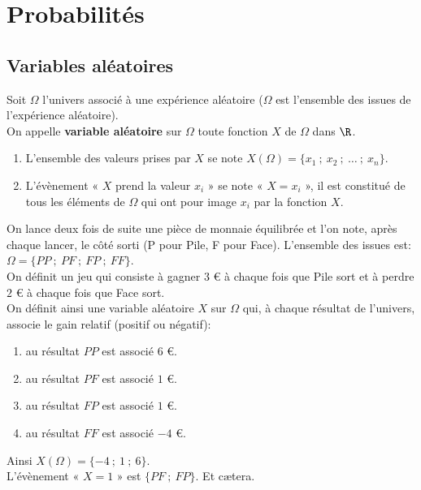 \documentclass[a4paper,11pt,cours]{nsi} %
\begin{document}
\setcounter{chapter}{8} %

\chapter{Probabilités}
\section{Variables aléatoires}
\begin{definition}
	Soit $\Omega$ l'univers associé à une expérience aléatoire ($\Omega$ est l'ensemble des issues de l'expérience aléatoire).\\
	On appelle \textbf{variable aléatoire} sur $\Omega$ toute fonction $X$ de $\Omega$ dans $\R$.
\end{definition}

\begin{remarque}[s]
	\begin{enumerate}[label=\textbullet]
		\item 		L'ensemble des valeurs prises par $X$ se note $X(\Omega)=\{x_1 \ ; \ x_2 \ ; \ \ldots \ ; \ x_n\}$.
		\item 		L'évènement « $X$ prend la valeur $x_i$ » se note « $X=x_i$ », il est constitué de tous les éléments de $\Omega$ qui 
		ont 
		pour 								image $x_i$ par la fonction $X$.
	\end{enumerate}
\end{remarque}

\begin{exemple}[]
	On lance deux fois de suite une pièce de monnaie équilibrée et l'on note, après chaque lancer, le côté sorti (P pour Pile, F pour Face). 
	L'ensemble des issues est: $\Omega=\{PP \ ; \ PF \ ; \ FP \ ; \ FF\}$.\\
	On définit un jeu qui consiste à gagner $3$ € à chaque fois que Pile sort et à perdre $2$ € à chaque fois que Face sort.\\
	On définit ainsi une variable aléatoire $X$ sur $\Omega$ qui, à chaque résultat de l'univers, associe le gain relatif (positif ou négatif):
	\begin{enumerate}[label=\textbullet]
		\item 	au résultat $PP$ est associé $6$ €.
		\item 	au résultat $PF$ est associé $1$ €.
		\item 	au résultat $FP$ est associé $1$ €.
		\item 	au résultat $FF$ est associé $-4$ €.
	\end{enumerate}			
	Ainsi $X(\Omega)=\{-4 \ ; \ 1 \ ; \ 6\}$.\\
	L'évènement « $X=1$ » est $\{PF \ ; \ FP\}$.
	Et c\ae tera.
\end{exemple}
\end{document}
